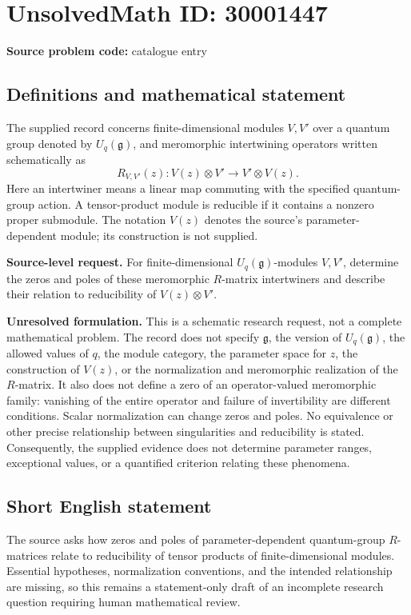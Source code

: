 \documentclass[11pt]{article}
\begin{document}
\section*{UnsolvedMath ID: 30001447}
\textbf{Source problem code:} catalogue entry
\subsection{Definitions and mathematical statement}
The supplied record concerns finite-dimensional modules \(V,V'\) over a quantum group denoted by \(U_q(\mathfrak g)\), and meromorphic intertwining operators written schematically as
\[
R_{V,V'}(z)\colon V(z)\otimes V'\longrightarrow V'\otimes V(z).
\]
Here an intertwiner means a linear map commuting with the specified quantum-group action. A tensor-product module is reducible if it contains a nonzero proper submodule. The notation \(V(z)\) denotes the source's parameter-dependent module; its construction is not supplied.

\textbf{Source-level request.} For finite-dimensional \(U_q(\mathfrak g)\)-modules \(V,V'\), determine the zeros and poles of these meromorphic \(R\)-matrix intertwiners and describe their relation to reducibility of \(V(z)\otimes V'\).

\textbf{Unresolved formulation.} This is a schematic research request, not a complete mathematical problem. The record does not specify \(\mathfrak g\), the version of \(U_q(\mathfrak g)\), the allowed values of \(q\), the module category, the parameter space for \(z\), the construction of \(V(z)\), or the normalization and meromorphic realization of the \(R\)-matrix. It also does not define a zero of an operator-valued meromorphic family: vanishing of the entire operator and failure of invertibility are different conditions. Scalar normalization can change zeros and poles. No equivalence or other precise relationship between singularities and reducibility is stated. Consequently, the supplied evidence does not determine parameter ranges, exceptional values, or a quantified criterion relating these phenomena.
\subsection{Short English statement}
The source asks how zeros and poles of parameter-dependent quantum-group \(R\)-matrices relate to reducibility of tensor products of finite-dimensional modules. Essential hypotheses, normalization conventions, and the intended relationship are missing, so this remains a statement-only draft of an incomplete research question requiring human mathematical review.
\end{document}
